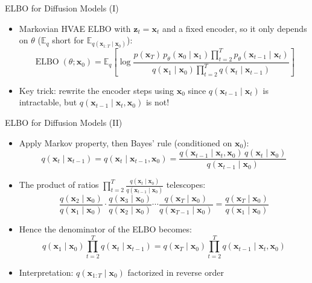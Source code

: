 \documentclass[11pt,compress,t,notes=noshow, xcolor=table]{beamer}
\providecommand{\bx}{\mathbf{x}}
\providecommand{\bz}{\mathbf{z}}
\begin{document}
 
 
 
 
\begin{frame}{ELBO for Diffusion Models (I)}

\vfill

\begin{itemize}
\item Markovian HVAE ELBO with $\bz_t = \bx_t$ and a fixed encoder, so it only depends on $\theta$ ($\mathbb{E}_q$ short for $\mathbb{E}_{q(\bx_{1:T} \mid \bx_0)}$):
\begin{equation*}
\operatorname{ELBO}(\theta; \bx_0) = \mathbb{E}_{q}\left[\log \frac{p(\bx_T)\, p_\theta(\bx_0 \mid \bx_1) \prod_{t=2}^{T} p_\theta(\bx_{t-1} \mid \bx_t)}{q(\bx_1 \mid \bx_0) \prod_{t=2}^{T} q(\bx_t \mid \bx_{t-1})}\right]
\end{equation*}
\item Key trick: rewrite the encoder steps using $\bx_0$ since $q(\bx_{t-1} \mid \bx_t)$ is intractable, but $q(\bx_{t-1} \mid \bx_t, \bx_0)$ is not!
\end{itemize}

\vfill

\end{frame}


\begin{frame}{ELBO for Diffusion Models (II)}

\vfill

\begin{itemize}
\item Apply Markov property, then Bayes' rule (conditioned on $\bx_0$):
\begin{equation*}
q(\bx_t \mid \bx_{t-1}) = q(\bx_t \mid \bx_{t-1}, \bx_0) = \frac{q(\bx_{t-1} \mid \bx_t, \bx_0)\, q(\bx_t \mid \bx_0)}{q(\bx_{t-1} \mid \bx_0)}
\end{equation*}
\item The product of ratios $\prod_{t=2}^{T} \frac{q(\bx_t \mid \bx_0)}{q(\bx_{t-1} \mid \bx_0)}$ telescopes:
\begin{equation*}
\frac{q(\bx_2 \mid \bx_0)}{q(\bx_1 \mid \bx_0)} \cdot \frac{q(\bx_3 \mid \bx_0)}{q(\bx_2 \mid \bx_0)} \cdots \frac{q(\bx_T \mid \bx_0)}{q(\bx_{T-1} \mid \bx_0)} = \frac{q(\bx_T \mid \bx_0)}{q(\bx_1 \mid \bx_0)}
\end{equation*}
\item Hence the denominator of the ELBO becomes:
\begin{equation*}
q(\bx_1 \mid \bx_0) \prod_{t=2}^{T} q(\bx_t \mid \bx_{t-1}) = q(\bx_T \mid \bx_0) \prod_{t=2}^{T} q(\bx_{t-1} \mid \bx_t, \bx_0)
\end{equation*}
\item Interpretation: $q(\bx_{1:T} \mid \bx_0)$ factorized in reverse order
\end{itemize}

\vfill

\end{frame}
\end{document}
